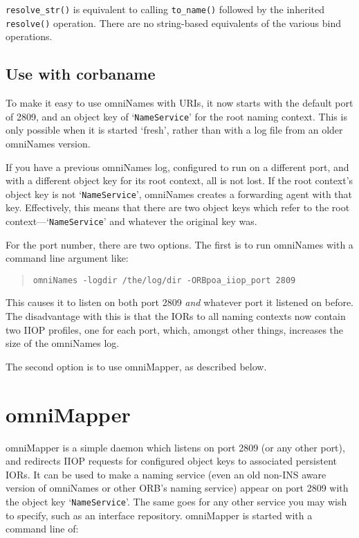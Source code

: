 \documentclass[11pt,twoside,a4paper]{book}
\newcommand{\op}[1]{\texttt{#1()}}
\newcommand{\cmdline}[1]{\texttt{#1}}
\newcommand{\corbauri}{\begingroup \urlstyle{tt}\Url}
\begin{document}
\op{resolve\_str} is equivalent to calling \op{to\_name} followed by
the inherited \op{resolve} operation. There are no string-based
equivalents of the various bind operations.


\subsection{Use with corbaname}

To make it easy to use omniNames with \corbauri{corbaname} URIs, it
now starts with the default port of 2809, and an object key of
`\texttt{NameService}' for the root naming context. This is only
possible when it is started `fresh', rather than with a log file from
an older omniNames version.

If you have a previous omniNames log, configured to run on a different
port, and with a different object key for its root context, all is not
lost. If the root context's object key is not `\texttt{NameService}',
omniNames creates a forwarding agent with that key. Effectively, this
means that there are two object keys which refer to the root
context---`\texttt{NameService}' and whatever the original key was.

For the port number, there are two options. The first is to run
omniNames with a command line argument like:

\begin{quote}
\cmdline{omniNames -logdir /the/log/dir -ORBpoa\_iiop\_port 2809}
\end{quote}

\noindent This causes it to listen on both port 2809 \emph{and}
whatever port it listened on before. The disadvantage with this is
that the IORs to all naming contexts now contain two IIOP profiles,
one for each port, which, amongst other things, increases the size of
the omniNames log.

The second option is to use omniMapper, as described below.


\section{omniMapper}

omniMapper is a simple daemon which listens on port 2809 (or any other
port), and redirects IIOP requests for configured object keys to
associated persistent IORs. It can be used to make a naming service
(even an old non-INS aware version of omniNames or other ORB's naming
service) appear on port 2809 with the object key
`\texttt{NameService}'. The same goes for any other service you may
wish to specify, such as an interface repository. omniMapper is
started with a command line of:
\end{document}
